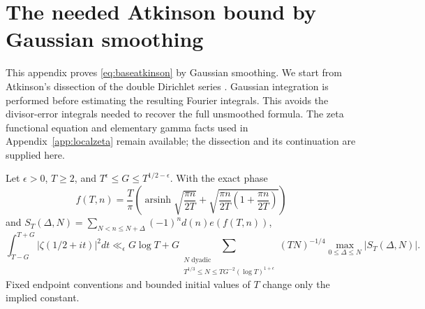 \section{The needed Atkinson bound by Gaussian smoothing}
\label{app:atkinsondirect}

This appendix proves \eqref{eq:baseatkinson} by Gaussian smoothing.
We start from Atkinson's dissection of the double Dirichlet series
\cite{Atk49,SS23}. Gaussian integration is performed before estimating
the resulting Fourier integrals. This avoids the divisor-error integrals
needed to recover the full unsmoothed formula. The zeta functional
equation and elementary gamma facts used in Appendix~\ref{app:localzeta}
remain available; the dissection and its continuation are supplied here.

\begin{proposition}
\label{prop:atkinsondirect}
Let $\epsilon>0$, $T\ge2$, and
$T^\epsilon\le G\le T^{1/2-\epsilon}$. With the exact phase
\[
 f(T,n)=\frac T\pi\left(\operatorname{arsinh}\sqrt{\frac{\pi n}{2T}}
       +\sqrt{\frac{\pi n}{2T}\left(1+\frac{\pi n}{2T}\right)}\right)
\]
and $S_T(\Delta,N)=\sum_{N<n\le N+\Delta}(-1)^nd(n)e(f(T,n))$,
\[
 \int_{T-G}^{T+G}|\zeta(1/2+it)|^2dt
 \ll_\epsilon G\log T+
 G\sum_{\substack{N\text{ dyadic}\\T^{1/3}\le N\le
 T G^{-2}(\log T)^{1+\epsilon}}}
 (TN)^{-1/4}\max_{0\le\Delta\le N}|S_T(\Delta,N)|.
\]
Fixed endpoint conventions and bounded initial values of $T$ change
only the implied constant.
\end{proposition}

